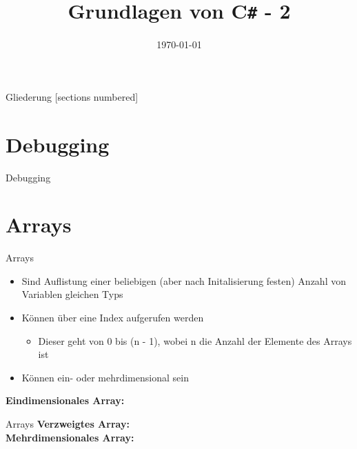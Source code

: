 



\title{Grundlagen von C\texttt{\#} - 2}
\date{\today}




\maketitle

\begin{frame}{Gliederung}
	[sections numbered]
	\tableofcontents
\end{frame}

\section{Debugging}
\begin{frame}{Debugging}

\end{frame}

\section{Arrays}
\begin{frame}{Arrays}
	\begin{itemize}
		\item Sind Auflistung einer beliebigen (aber nach Initalisierung festen) Anzahl von Variablen gleichen Typs
		\item Können über eine Index aufgerufen werden
		\begin{itemize}
			\item Dieser geht von 0 bis (n - 1), wobei n die Anzahl der Elemente des Arrays ist
		\end{itemize}
		\item Können ein- oder mehrdimensional sein
	\end{itemize}
	\textbf{Eindimensionales Array:}\\
		
\end{frame}

\begin{frame}{Arrays}
	\textbf{Verzweigtes Array:}\\
	
	\textbf{Mehrdimensionales Array:}\\
		
\end{frame}


